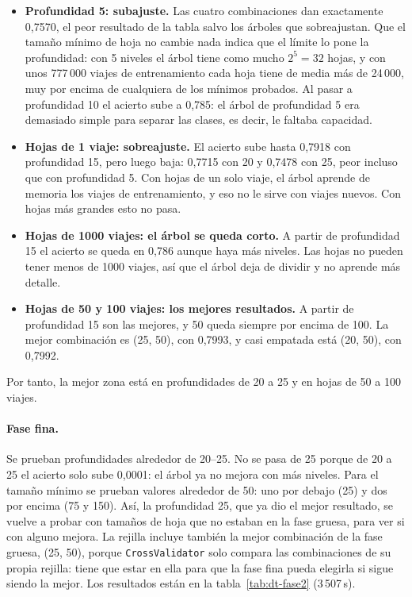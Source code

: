\documentclass[12pt,a4paper]{article}
\begin{document}
\begin{itemize}
    \item \textbf{Profundidad 5: subajuste.} Las cuatro combinaciones dan
    exactamente 0,7570, el peor resultado de la tabla salvo los árboles que
    sobreajustan. Que el tamaño mínimo de hoja no cambie nada indica que el
    límite lo pone la profundidad: con 5 niveles el árbol tiene como mucho
    $2^5 = 32$ hojas, y con unos 777\,000 viajes de entrenamiento cada hoja
    tiene de media más de 24\,000, muy por encima de cualquiera de los
    mínimos probados. Al pasar a profundidad 10 el acierto sube a 0,785: el
    árbol de profundidad 5 era demasiado simple para separar las clases, es
    decir, le faltaba capacidad.
    \item \textbf{Hojas de 1 viaje: sobreajuste.} El acierto sube hasta
    0,7918 con profundidad 15, pero luego baja: 0,7715 con 20 y 0,7478 con
    25, peor incluso que con profundidad 5. Con hojas de un solo viaje, el
    árbol aprende de memoria los viajes de entrenamiento, y eso no le sirve
    con viajes nuevos. Con hojas más grandes esto no pasa.
    \item \textbf{Hojas de 1000 viajes: el árbol se queda corto.} A partir
    de profundidad 15 el acierto se queda en 0,786 aunque haya más niveles.
    Las hojas no pueden tener menos de 1000 viajes, así que el árbol deja de
    dividir y no aprende más detalle.
    \item \textbf{Hojas de 50 y 100 viajes: los mejores resultados.} A
    partir de profundidad 15 son las mejores, y 50 queda siempre por encima
    de 100. La mejor combinación es (25, 50), con 0,7993, y casi empatada
    está (20, 50), con 0,7992.
\end{itemize}
 
Por tanto, la mejor zona está en profundidades de 20 a 25 y en hojas de 50
a 100 viajes.
 
\paragraph{Fase fina.} Se prueban profundidades alrededor de 20--25. No se
pasa de 25 porque de 20 a 25 el acierto solo sube 0,0001: el árbol ya no
mejora con más niveles. Para el tamaño mínimo se prueban valores alrededor
de 50: uno por debajo (25) y dos por encima (75 y 150). Así, la
profundidad 25, que ya dio el mejor resultado, se vuelve a probar con
tamaños de hoja que no estaban en la fase gruesa, para ver si con alguno
mejora. La rejilla incluye también la mejor combinación de la fase gruesa,
(25, 50), porque \texttt{CrossValidator} solo compara las combinaciones de
su propia rejilla: tiene que estar en ella para que la fase fina pueda
elegirla si sigue siendo la mejor. Los resultados están en la
tabla~\ref{tab:dt-fase2} (3\,507\,s).
\end{document}
